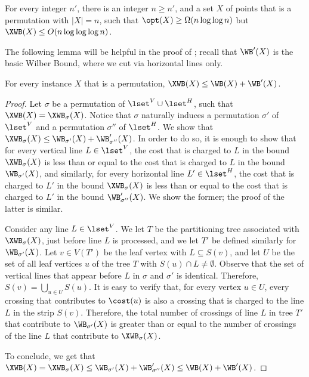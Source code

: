 \documentclass{toc}
\begin{document}
%


\begin{theorem}
	\label{thm:negative for XWB}
	For every integer $n'$, there is an integer $n\geq n'$, and a set $X$ of points that is a permutation with $|X|=n$, such that $\opt(X)\geq \Omega(n\log\log n)$ but $\XWB(X)\leq O(n\log\log\log n)$.
\end{theorem}


%

%
%

The following lemma will be helpful in the proof of ; recall that $\WB'(X)$ is the basic Wilber Bound, where we cut via horizontal lines only.

\begin{lemma}\label{lem: extended WB from vertical and horizontal}
	For every instance $X$ that is a permutation, $\XWB(X)\leq \WB(X)+\WB'(X)$.
\end{lemma}

\begin{proof}
	Let $\sigma$ be a permutation of $\lset^V\cup \lset^H$, such that $\XWB(X)=\XWB_{\sigma}(X)$. Notice that $\sigma$ naturally induces a permutation $\sigma'$ of $\lset^V$ and a permutation $\sigma''$ of $\lset^H$. We show that $\XWB_{\sigma}(X)\leq \WB_{\sigma'}(X)+\WB'_{\sigma''}(X)$. In order to do so, it is enough to show that for every vertical line $L\in \lset^V$, the cost that is charged to $L$ in the bound $\XWB_{\sigma}(X)$ is less than or equal to the cost that is charged to $L$ in the bound $\WB_{\sigma'}(X)$, and similarly, for every horizontal line $L'\in \lset^H$, the cost that is charged to $L'$ in the bound $\XWB_{\sigma}(X)$ is less than or equal to the cost that is charged to $L'$ in the bound $\WB'_{\sigma''}(X)$. We show the former; the proof of the latter is similar.
	
	Consider any line $L\in \lset^V$. We let $T$ be the partitioning tree associated with $\XWB_{\sigma}(X)$, just before line $L$ is processed, and we let $T'$ be defined similarly for $\WB_{\sigma'}(X)$. Let $v\in V(T')$ be the leaf vertex with $L\subseteq S(v)$, and let $U$ be the set of all leaf vertices $u$ of the tree $T$ with $S(u)\cap L\neq \emptyset$. Observe that the set of vertical lines that appear before $L$ in $\sigma$ and $\sigma'$ is identical. Therefore, $S(v)=\bigcup_{u\in U}S(u)$. It is easy to verify that, for every vertex $u\in U$, every crossing that contributes to $\cost(u)$ is also a crossing that is charged to the line $L$ in the strip $S(v)$. Therefore, the total number of crossings of line $L$ in tree $T'$ that contribute to $\WB_{\sigma'}(X)$ is greater than or equal to the number of crossings of the line $L$ that contribute to $\XWB_{\sigma}(X)$.
	
	To conclude, we get that $\XWB(X)=\XWB_{\sigma}(X)\leq \WB_{\sigma'}(X)+\WB'_{\sigma''}(X)\leq \WB(X)+\WB'(X)$.
\end{proof}
 
\end{document}
